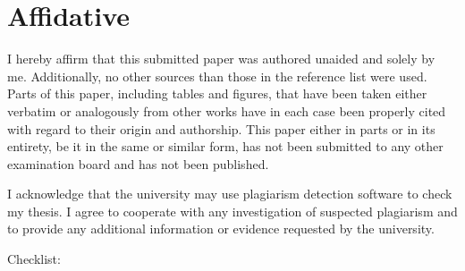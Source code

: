 \documentclass[
  man,
  floatsintext,
  longtable,
  nolmodern,
  notxfonts,
  notimes,
  colorlinks=true,linkcolor=blue,citecolor=blue,urlcolor=blue]{apa7}
\begin{document}
\newpage

\section{Affidative}\label{affidative}

I hereby affirm that this submitted paper was authored unaided and
solely by me. Additionally, no other sources than those in the reference
list were used. Parts of this paper, including tables and figures, that
have been taken either verbatim or analogously from other works have in
each case been properly cited with regard to their origin and
authorship. This paper either in parts or in its entirety, be it in the
same or similar form, has not been submitted to any other examination
board and has not been published.

I acknowledge that the university may use plagiarism detection software
to check my thesis. I agree to cooperate with any investigation of
suspected plagiarism and to provide any additional information or
evidence requested by the university.

Checklist:
\end{document}
